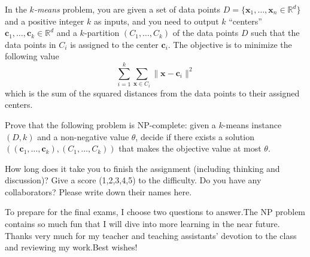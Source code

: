 \documentclass{oxmathproblems}
\begin{document}
\begin{questions}
\miquestion[50]
In the \emph{$k$-means} problem, you are given a set of data points $D=\{\mathbf{x}_1,\ldots,\mathbf{x}_n\in\mathbb{R}^d\}$ and a positive integer $k$ as inputs, and you need to output $k$ ``centers'' $\mathbf{c}_1,\ldots,\mathbf{c}_k\in\mathbb{R}^d$ and a $k$-partition $(C_1,\ldots,C_k)$ of the data points $D$ such that the data points in $C_i$ is assigned to the center $\mathbf{c}_i$.
The objective is to minimize the following value
$$\sum_{i=1}^k\sum_{\mathbf{x}\in C_i}\|\mathbf{x}-\mathbf{c}_i\|^2$$
which is the sum of the squared distances from the data points to their assigned centers.

Prove that the following problem is NP-complete:
given a $k$-means instance $(D,k)$ and a non-negative value $\theta$, decide if there exists a solution $((\mathbf{c}_1,\ldots,\mathbf{c}_k),(C_1,\ldots,C_k))$ that makes the objective value at most $\theta$.

  
  
\miquestion
How long does it take you to finish the assignment (including thinking and discussion)?
Give a score (1,2,3,4,5) to the difficulty.
Do you have any collaborators?
Please write down their names here.
 
To prepare for the final exams, I choose two questions to answer.The NP problem contains so much fun that I will dive into more learning in the near future. Thanks very much for my teacher and teaching assistants' devotion to the class and reviewing my work.Best wishes!


\end{questions}
\end{document}
